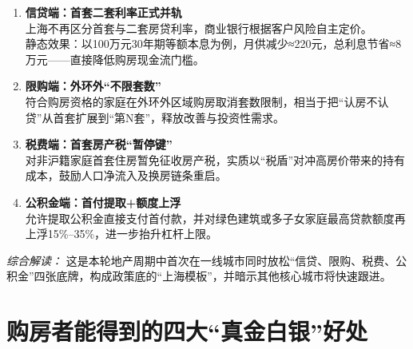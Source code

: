 \begin{enumerate}[leftmargin=*, nosep]
    \item \textbf{信贷端：首套二套利率正式并轨}  \\
    上海不再区分首套与二套房贷利率，商业银行根据客户风险自主定价。  \\
    静态效果：以100万元30年期等额本息为例，月供减少≈220元，总利息节省≈8万元——直接降低购房现金流门槛。

    \item \textbf{限购端：外环外“不限套数”}  \\
    符合购房资格的家庭在外环外区域购房取消套数限制，相当于把“认房不认贷”从首套扩展到“第N套”，释放改善与投资性需求。

    \item \textbf{税费端：首套房产税“暂停键”}  \\
    对非沪籍家庭首套住房暂免征收房产税，实质以“税盾”对冲高房价带来的持有成本，鼓励人口净流入及换房链条重启。

    \item \textbf{公积金端：首付提取+额度上浮}  \\
    允许提取公积金直接支付首付款，并对绿色建筑或多子女家庭最高贷款额度再上浮15\%–35\%，进一步抬升杠杆上限。
\end{enumerate}

\textit{综合解读：} 这是本轮地产周期中首次在一线城市同时放松“信贷、限购、税费、公积金”四张底牌，构成政策底的“上海模板”，并暗示其他核心城市将快速跟进。


\section{购房者能得到的四大“真金白银”好处}

